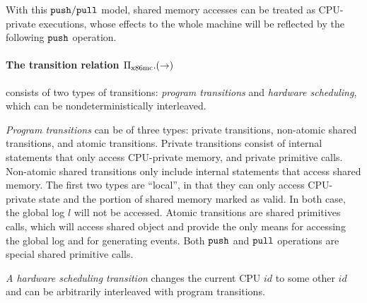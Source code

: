With this ${\texttt{push}}/{\texttt{pull}}$ model, shared memory accesses
can be treated as CPU-private executions,
whose effects to the whole machine
will be reflected by the following ${\texttt{push}}$ operation. 

\paragraph{The transition relation $\Pi_{\text{x86mc}}.(\rightarrow)$}
consists of two types of transitions: 
\emph{program transitions} and \emph{hardware scheduling}, which can 
be nondeterministically interleaved.

\emph{Program transitions} can be of three types:
private transitions,
non-atomic shared transitions,
and atomic transitions.
Private transitions consist of
internal statements that only access
CPU-private memory,
and  private primitive calls.
Non-atomic shared transitions
only include 
internal statements that access shared memory.
The first two types are ``local'', 
in that they can only access CPU-private 
state and the portion of shared memory marked as valid.
In both case, the global log $l$ will not be accessed.
Atomic transitions are
shared primitives calls, 
which will access shared object
and provide the only means 
for accessing the global log and for generating events.
Both ${\texttt{push}}$ and ${\texttt{pull}}$ operations
are special shared primitive calls.

\emph{A hardware scheduling transition} changes the
current CPU $id$ to some other $id$ 
and  can be arbitrarily interleaved with
program transitions.

